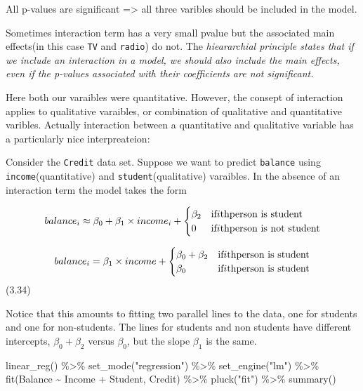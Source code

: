 \documentclass[
  letterpaper,
  DIV=11,
  numbers=noendperiod]{scrreprt}
\newenvironment{Shaded}{\begin{snugshade}}{\end{snugshade}}
\newcommand{\FunctionTok}[1]{\textcolor[rgb]{0.02,0.16,0.49}{#1}}
\newcommand{\NormalTok}[1]{\textcolor[rgb]{0.33,0.33,0.33}{#1}}
\newcommand{\SpecialCharTok}[1]{\textcolor[rgb]{0.00,0.46,0.62}{#1}}
\newcommand{\StringTok}[1]{\textcolor[rgb]{0.00,0.50,0.00}{#1}}
\begin{document}
All p-values are significant =\textgreater{} all three varibles should
be included in the model.

Sometimes interaction term has a very small pvalue but the associated
main effects(in this case \texttt{TV} and \texttt{radio}) do not. The
\emph{hieararchial principle states that if we include an interaction in
a model, we should also include the main effects, even if the p-values
associated with their coefficients are not significant.}

Here both our varaibles were quantitative. However, the consept of
interaction applies to qualitative varaibles, or combination of
qualitative and quantitative varibles. Actually interaction between a
quantitative and qualitative variable has a particularly nice
interpreateion:

Consider the \texttt{Credit} data set. Suppose we want to predict
\texttt{balance} using \texttt{income}(quantitative) and
\texttt{student}(qualitative) varaibles. In the absence of an
interaction term the model takes the form

\[
balance_i  \approx \beta_0 + \beta_1 \times income_i + 
\begin{cases}
\beta_2 & \text{if} \space i\text{th} \space \text{person is student} \\
0 & \text{if} \space i\text{th} \space \text{person is not student}
\end{cases}
\]

\[
balance_i = \beta_1 \times income + 
\begin{cases}
\beta_0 + \beta_2 & \text{if} \space i\text{th} \space \text{person is student} \\
\beta_0 &\text{if} \space i\text{th} \space \text{person is student}
\end{cases}
\] (3.34)

Notice that this amounts to fitting two parallel lines to the data, one
for students and one for non-students. The lines for students and non
students have different intercepts, \(\beta_0 + \beta_2\) versus
\(\beta_0\), but the slope \(\beta_1\) is the same.

\begin{Shaded}
\begin{Highlighting}[]
\FunctionTok{linear\_reg}\NormalTok{() }\SpecialCharTok{\%\textgreater{}\%} 
  \FunctionTok{set\_mode}\NormalTok{(}\StringTok{"regression"}\NormalTok{) }\SpecialCharTok{\%\textgreater{}\%} 
  \FunctionTok{set\_engine}\NormalTok{(}\StringTok{"lm"}\NormalTok{) }\SpecialCharTok{\%\textgreater{}\%} 
  \FunctionTok{fit}\NormalTok{(Balance }\SpecialCharTok{\textasciitilde{}}\NormalTok{ Income }\SpecialCharTok{+}\NormalTok{ Student, Credit) }\SpecialCharTok{\%\textgreater{}\%} 
  \FunctionTok{pluck}\NormalTok{(}\StringTok{"fit"}\NormalTok{) }\SpecialCharTok{\%\textgreater{}\%} 
  \FunctionTok{summary}\NormalTok{()}
\end{Highlighting}
\end{Shaded}
\end{document}
